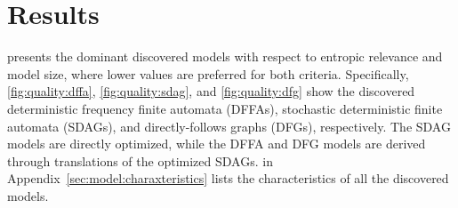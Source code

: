 \documentclass{article}
\begin{document}
\section{Results}
\label{sec:results}
 presents the dominant discovered models with respect to entropic relevance and model size, where lower values are preferred for both criteria.
Specifically, \cref{fig:quality:dffa}, \cref{fig:quality:sdag}, and \cref{fig:quality:dfg} show the discovered deterministic frequency finite automata (DFFAs), stochastic deterministic finite automata (SDAGs), and directly-follows graphs (DFGs), respectively. The SDAG models are directly optimized, while the DFFA and DFG models are derived through translations of the optimized SDAGs.
 in Appendix~\ref{sec:model:charaxteristics} lists the characteristics of all the discovered models. 
\end{document}
